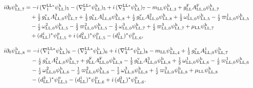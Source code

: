 \documentclass[
  10pt,
]{article}
\begin{document}
\[\begin{aligned}
i\partial_0\psi^{\rm h}_{{\rm LL},7}&=-i\,(\nabla^{{\rm LL}*}_1\psi^{\rm h}_{\rm LL})_5-(\nabla^{{\rm LL}*}_2\psi^{\rm h}_{\rm LL})_5+i\,(\nabla^{{\rm LL}*}_3\psi^{\rm h}_{\rm LL})_7-m_{\rm LL}\psi^{\rm h}_{{\rm LL},3}+g^{\rm F}_{\rm LL}A^{\rm F}_{{\rm LL},0}\psi^{\rm h}_{{\rm LL},7}\\
&\quad +\tfrac{1}{2}\,g^{\rm v}_{\rm LL}A^{3}_{{\rm LL},0}\psi^{\rm h}_{{\rm LL},7}+\tfrac{1}{2}\,g^{\rm v}_{\rm LL}A^{1}_{{\rm LL},0}\psi^{\rm h}_{{\rm LL},8}+\tfrac{i}{2}\,g^{\rm v}_{\rm LL}A^{2}_{{\rm LL},0}\psi^{\rm h}_{{\rm LL},8}+\tfrac{1}{2}\,\omega^{1}_{{\rm LL},0}\psi^{\rm h}_{{\rm LL},5}-\tfrac{i}{2}\,\varpi^{1}_{{\rm LL},0}\psi^{\rm h}_{{\rm LL},5}\\
&\quad -\tfrac{i}{2}\,\omega^{2}_{{\rm LL},0}\psi^{\rm h}_{{\rm LL},5}-\tfrac{1}{2}\,\varpi^{2}_{{\rm LL},0}\psi^{\rm h}_{{\rm LL},5}-\tfrac{1}{2}\,\omega^{3}_{{\rm LL},0}\psi^{\rm h}_{{\rm LL},7}+\tfrac{i}{2}\,\varpi^{3}_{{\rm LL},0}\psi^{\rm h}_{{\rm LL},7}+\mu_{\rm LL}\psi^{\rm h}_{{\rm LL},7}\\
&\quad +(d^{1}_{\rm LL})^*\psi^{\rm p}_{{\rm LL},5}+i\,(d^{2}_{\rm LL})^*\psi^{\rm p}_{{\rm LL},5}-(d^{3}_{\rm LL})^*\psi^{\rm p}_{{\rm LL},6},
\end{aligned}\]

\[\begin{aligned}
i\partial_0\psi^{\rm h}_{{\rm LL},8}&=-i\,(\nabla^{{\rm LL}*}_1\psi^{\rm h}_{\rm LL})_6-(\nabla^{{\rm LL}*}_2\psi^{\rm h}_{\rm LL})_6+i\,(\nabla^{{\rm LL}*}_3\psi^{\rm h}_{\rm LL})_8-m_{\rm LL}\psi^{\rm h}_{{\rm LL},4}+\tfrac{1}{2}\,g^{\rm v}_{\rm LL}A^{1}_{{\rm LL},0}\psi^{\rm h}_{{\rm LL},7}\\
&\quad -\tfrac{i}{2}\,g^{\rm v}_{\rm LL}A^{2}_{{\rm LL},0}\psi^{\rm h}_{{\rm LL},7}+g^{\rm F}_{\rm LL}A^{\rm F}_{{\rm LL},0}\psi^{\rm h}_{{\rm LL},8}-\tfrac{1}{2}\,g^{\rm v}_{\rm LL}A^{3}_{{\rm LL},0}\psi^{\rm h}_{{\rm LL},8}+\tfrac{1}{2}\,\omega^{1}_{{\rm LL},0}\psi^{\rm h}_{{\rm LL},6}-\tfrac{i}{2}\,\varpi^{1}_{{\rm LL},0}\psi^{\rm h}_{{\rm LL},6}\\
&\quad -\tfrac{i}{2}\,\omega^{2}_{{\rm LL},0}\psi^{\rm h}_{{\rm LL},6}-\tfrac{1}{2}\,\varpi^{2}_{{\rm LL},0}\psi^{\rm h}_{{\rm LL},6}-\tfrac{1}{2}\,\omega^{3}_{{\rm LL},0}\psi^{\rm h}_{{\rm LL},8}+\tfrac{i}{2}\,\varpi^{3}_{{\rm LL},0}\psi^{\rm h}_{{\rm LL},8}+\mu_{\rm LL}\psi^{\rm h}_{{\rm LL},8}\\
&\quad -(d^{3}_{\rm LL})^*\psi^{\rm p}_{{\rm LL},5}-(d^{1}_{\rm LL})^*\psi^{\rm p}_{{\rm LL},6}+i\,(d^{2}_{\rm LL})^*\psi^{\rm p}_{{\rm LL},6}.
\end{aligned}\]
\end{document}
